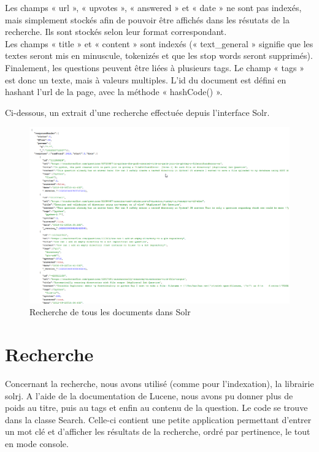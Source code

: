 \documentclass[a4paper]{article}
\begin{document}
	Les champs « url », « upvotes », « answered » et « date » ne sont pas indexés,
	mais simplement stockés afin de pouvoir être affichés dans les résutats de la recherche.
	Ils sont stockés selon leur format correspondant. \\
	Les champs « title » et « content » sont indexés (« text\_general » signifie que les textes seront mis en minuscule, tokenizés et que les stop words seront supprimés). \\
	Finalement, les questions peuvent être liées à plusieurs tags. Le champ « tags » est donc un texte, mais à valeurs multiples.
	L'id du document est défini en hashant l'url de la page, avec la méthode « hashCode() ».
	
	Ci-dessous, un extrait d'une recherche effectuée depuis l'interface Solr.

	\begin{figure}[H]
		\centering
		\includegraphics[width=\columnwidth]{images/02-solr-content.png}
		\caption{Recherche de tous les documents dans Solr}
	\end{figure}

	\section{Recherche}
	Concernant la recherche, nous avons utilisé (comme pour l'indexation),
	la librairie solrj. A l'aide de la documentation de Lucene,
	nous avons pu donner plus de poids au titre, puis au tags et enfin au contenu de la question.
	Le code se trouve dans la classe Search. Celle-ci contient une petite application permettant d'entrer un mot clé et d'afficher les résultats de la recherche,
	ordré par pertinence, le tout en mode console.
	
\end{document}

